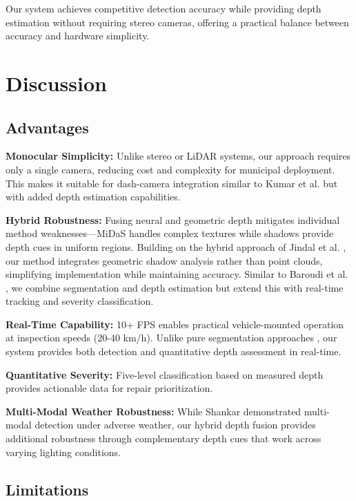 \documentclass[conference]{IEEEtran}
\begin{document}
Our system achieves competitive detection accuracy while providing depth estimation without requiring stereo cameras, offering a practical balance between accuracy and hardware simplicity.

\section{Discussion}

\subsection{Advantages}

\textbf{Monocular Simplicity:} Unlike stereo or LiDAR systems, our approach requires only a single camera, reducing cost and complexity for municipal deployment. This makes it suitable for dash-camera integration similar to Kumar et al. \cite{kumar_yolov8} but with added depth estimation capabilities.

\textbf{Hybrid Robustness:} Fusing neural and geometric depth mitigates individual method weaknesses—MiDaS handles complex textures while shadows provide depth cues in uniform regions. Building on the hybrid approach of Jindal et al. \cite{jindal_hybrid}, our method integrates geometric shadow analysis rather than point clouds, simplifying implementation while maintaining accuracy. Similar to Baroudi et al. \cite{baroudi_enhanced}, we combine segmentation and depth estimation but extend this with real-time tracking and severity classification.

\textbf{Real-Time Capability:} 10+ FPS enables practical vehicle-mounted operation at inspection speeds (20-40 km/h). Unlike pure segmentation approaches \cite{kumar_yolov8}, our system provides both detection and quantitative depth assessment in real-time.

\textbf{Quantitative Severity:} Five-level classification based on measured depth provides actionable data for repair prioritization.

\textbf{Multi-Modal Weather Robustness:} While Shankar \cite{shankar_multimodal} demonstrated multi-modal detection under adverse weather, our hybrid depth fusion provides additional robustness through complementary depth cues that work across varying lighting conditions.

\subsection{Limitations}
\end{document}

